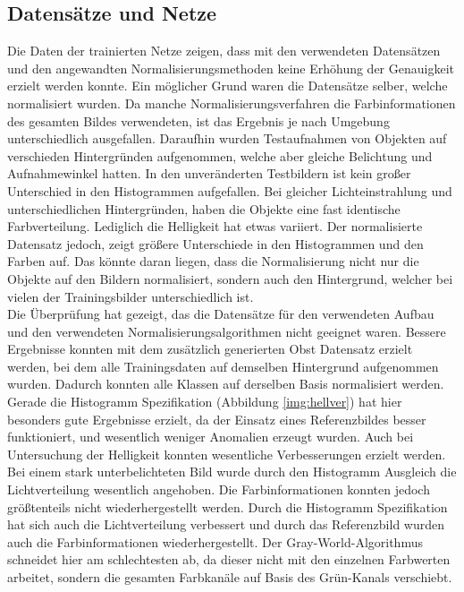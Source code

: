 \documentclass[a4paper,12pt,oneside]{article}
\begin{document}
\subsection{Datensätze und Netze}
Die Daten der trainierten Netze zeigen, dass mit den verwendeten Datensätzen und den angewandten Normalisierungsmethoden keine Erhöhung der Genauigkeit erzielt werden konnte. Ein möglicher Grund waren die Datensätze selber, welche normalisiert wurden. Da manche Normalisierungsverfahren die Farbinformationen des gesamten Bildes verwendeten, ist das Ergebnis je nach Umgebung unterschiedlich ausgefallen.
Daraufhin wurden Testaufnahmen von Objekten auf verschieden Hintergründen aufgenommen, welche aber gleiche Belichtung und Aufnahmewinkel hatten. In den unveränderten Testbildern ist kein großer Unterschied in den Histogrammen aufgefallen. Bei gleicher Lichteinstrahlung und unterschiedlichen Hintergründen, haben die Objekte eine fast identische Farbverteilung. Lediglich die Helligkeit hat etwas variiert. Der normalisierte Datensatz jedoch, zeigt größere Unterschiede in den Histogrammen und den Farben auf. Das könnte daran liegen, dass die Normalisierung nicht nur die Objekte auf den Bildern normalisiert, sondern auch den Hintergrund, welcher bei vielen der Trainingsbilder unterschiedlich ist.\\ 
Die Überprüfung hat gezeigt, das die Datensätze für den verwendeten Aufbau und den verwendeten Normalisierungsalgorithmen nicht geeignet waren. Bessere Ergebnisse konnten mit dem zusätzlich generierten Obst Datensatz erzielt werden, bei dem alle Trainingsdaten auf demselben Hintergrund aufgenommen wurden. Dadurch konnten alle Klassen auf derselben Basis normalisiert werden. Gerade die Histogramm Spezifikation (Abbildung \ref{img:hellver}) hat hier besonders gute Ergebnisse erzielt, da der Einsatz eines Referenzbildes besser funktioniert, und wesentlich weniger Anomalien erzeugt wurden. Auch bei Untersuchung der Helligkeit konnten wesentliche Verbesserungen erzielt werden. Bei einem stark unterbelichteten Bild wurde durch den Histogramm Ausgleich die Lichtverteilung wesentlich angehoben. Die Farbinformationen konnten jedoch größtenteils nicht wiederhergestellt werden. Durch die Histogramm Spezifikation hat sich auch die Lichtverteilung verbessert und durch das Referenzbild wurden auch die Farbinformationen wiederhergestellt. Der Gray-World-Algorithmus schneidet hier am schlechtesten ab, da dieser nicht mit den einzelnen Farbwerten arbeitet, sondern die gesamten Farbkanäle auf Basis des Grün-Kanals verschiebt. 
\end{document}
